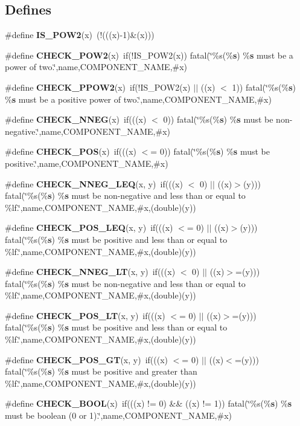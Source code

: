 \subsection*{Defines}
\begin{CompactItemize}
\item 
\#define {\bf IS\_\-POW2}(x)~(!(((x)-1)\&(x)))
\item 
\#define {\bf CHECK\_\-POW2}(x)~if(!IS\_\-POW2(x)) fatal(\char`\"{}\%s(\%{\bf s}) \%{\bf s} must be a power of two.\char`\"{},name,COMPONENT\_\-NAME,\#x)
\item 
\#define {\bf CHECK\_\-PPOW2}(x)~if(!IS\_\-POW2(x) $|$$|$ ((x) $<$ 1)) fatal(\char`\"{}\%s(\%{\bf s}) \%{\bf s} must be a positive power of two.\char`\"{},name,COMPONENT\_\-NAME,\#x)
\item 
\#define {\bf CHECK\_\-NNEG}(x)~if(((x) $<$ 0)) fatal(\char`\"{}\%s(\%{\bf s}) \%{\bf s} must be non-negative.\char`\"{},name,COMPONENT\_\-NAME,\#x)
\item 
\#define {\bf CHECK\_\-POS}(x)~if(((x) $<$= 0)) fatal(\char`\"{}\%s(\%{\bf s}) \%{\bf s} must be positive.\char`\"{},name,COMPONENT\_\-NAME,\#x)
\item 
\#define {\bf CHECK\_\-NNEG\_\-LEQ}(x, y)~if(((x) $<$ 0) $|$$|$ ((x)$>$(y))) fatal(\char`\"{}\%s(\%{\bf s}) \%{\bf s} must be non-negative and less than or equal to \%lf.\char`\"{},name,COMPONENT\_\-NAME,\#x,(double)(y))
\item 
\#define {\bf CHECK\_\-POS\_\-LEQ}(x, y)~if(((x) $<$= 0) $|$$|$ ((x)$>$(y))) fatal(\char`\"{}\%s(\%{\bf s}) \%{\bf s} must be positive and less than or equal to \%lf.\char`\"{},name,COMPONENT\_\-NAME,\#x,(double)(y))
\item 
\#define {\bf CHECK\_\-NNEG\_\-LT}(x, y)~if(((x) $<$ 0) $|$$|$ ((x)$>$=(y))) fatal(\char`\"{}\%s(\%{\bf s}) \%{\bf s} must be non-negative and less than or equal to \%lf.\char`\"{},name,COMPONENT\_\-NAME,\#x,(double)(y))
\item 
\#define {\bf CHECK\_\-POS\_\-LT}(x, y)~if(((x) $<$= 0) $|$$|$ ((x)$>$=(y))) fatal(\char`\"{}\%s(\%{\bf s}) \%{\bf s} must be positive and less than or equal to \%lf.\char`\"{},name,COMPONENT\_\-NAME,\#x,(double)(y))
\item 
\#define {\bf CHECK\_\-POS\_\-GT}(x, y)~if(((x) $<$= 0) $|$$|$ ((x)$<$=(y))) fatal(\char`\"{}\%s(\%{\bf s}) \%{\bf s} must be positive and greater than \%lf.\char`\"{},name,COMPONENT\_\-NAME,\#x,(double)(y))
\item 
\#define {\bf CHECK\_\-BOOL}(x)~if(((x) != 0) \&\& ((x) != 1)) fatal(\char`\"{}\%s(\%{\bf s}) \%{\bf s} must be boolean (0 or 1).\char`\"{},name,COMPONENT\_\-NAME,\#x)
\end{CompactItemize}


